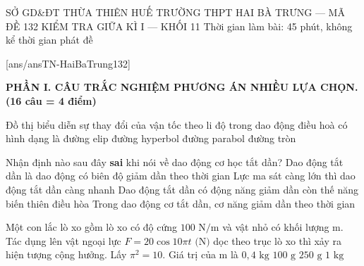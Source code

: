 \def\toanlop{11}
\def\thoigian{45}
\def\namhoc{2024 - 2025}
\begin{dethi}
	{SỞ GD\&ĐT THỪA THIÊN HUẾ}
	{TRƯỜNG THPT HAI BÀ TRƯNG --- MÃ ĐỀ 132}
	{KIỂM TRA GIỮA KÌ I --- KHỐI 11}
	{Thời gian làm bài: 45 phút, không kể thời gian phát đề}
\end{dethi}

[ans/ansTN-HaiBaTrung132]

\noindent \textbf{PHẦN I. CÂU TRẮC NGHIỆM PHƯƠNG ÁN NHIỀU LỰA CHỌN. (16 câu = 4 điểm)}

\begin{ex}%
	Đồ thị biểu diễn sự thay đổi của vận tốc theo li độ trong dao động điều hoà có hình dạng là
	\choice
	{\True đường elip}
	{đường hyperbol}
	{đường parabol}
	{đường tròn}
\end{ex}

\begin{ex}%
	Nhận định nào sau đây \textbf{sai} khi nói về dao động cơ học tắt dần?
	\choice
	{Dao động tắt dần là dao động có biên độ giảm dần theo thời gian}
	{Lực ma sát càng lớn thì dao động tắt dần càng nhanh}
	{\True Dao động tắt dần có động năng giảm dần còn thế năng biến thiên điều hòa}
	{Trong dao động cơ tắt dần, cơ năng giảm dần theo thời gian}
\end{ex}

\begin{ex}%
	Một con lắc lò xo gồm lò xo có độ cứng $100\text{ N/m}$ và vật nhỏ có khối lượng m. Tác dụng lên vật ngoại lực $F=20 \cos 10 \pi t\text{ (N)}$ dọc theo trục lò xo thì xảy ra hiện tượng cộng hưởng. Lấy $\pi^{2}=10$. Giá trị của m là
	\choice
	{$0,4\text{ kg}$}
	{$100\text{ g}$}
	{$250\text{ g}$}
	{\True $1\text{ kg}$}
\end{ex}

